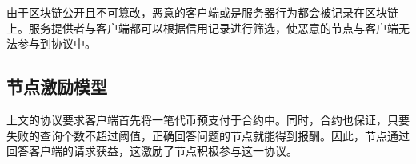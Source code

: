 由于区块链公开且不可篡改，恶意的客户端或是服务器行为都会被记录在区块链上。服务提供者与客户端都可以根据信用记录进行筛选，使恶意的节点与客户端无法参与到协议中。

\subsection{节点激励模型}
上文的协议要求客户端首先将一笔代币预支付于合约中。同时，合约也保证，只要失败的查询个数不超过阈值，正确回答问题的节点就能得到报酬。因此，节点通过回答客户端的请求获益，这激励了节点积极参与这一协议。